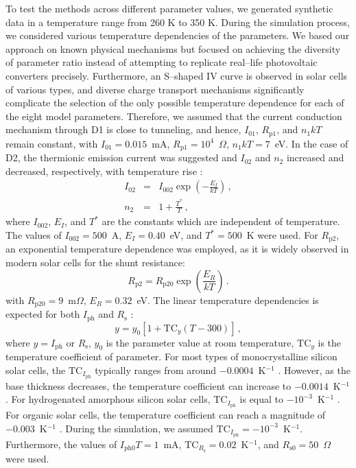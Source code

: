 \documentclass[a4paper,fleqn]{cas-dc}
\begin{document}
To test the methods across different parameter values, we generated synthetic data in a temperature range from 260 K to 350 K.
During the simulation process, we considered various temperature dependencies of the parameters.
We based our approach on known physical mechanisms but focused on achieving the diversity of parameter ratio
instead of attempting to replicate real--life photovoltaic converters precisely.
Furthermore, an S--shaped IV curve is observed in solar cells of various types,
and diverse charge transport mechanisms significantly complicate the selection of
the only possible temperature dependence for each of the eight model parameters.
Therefore, we assumed that the current conduction mechanism through D1 is close to tunneling,
and hence, $I_{01}$, $R_\mathrm{p1}$, and $n_1kT$ remain constant,
with $I_{01}=0.015$~mA, $R_\mathrm{p1}=10^4$~$\Omega$, $n_1kT=7$~eV.
In the case of D2, the thermionic emission current was suggested
and $I_{02}$ and $n_2$ increased and decreased, respectively, with temperature rise \cite{Sze2012}:
\begin{eqnarray}
I_{02}&=& I_{002}\exp\left(-\frac{E_I}{kT}\right)\,,\\
n_2&=&1+\frac{T^*}{T}\,,
\end{eqnarray}
where $I_{002}$, $E_I$, and $T^*$ are the constants which are independent of temperature.
The values of $I_{002}=500$~A, $E_I=0.40$~eV, and $T^*=500$~K were used.
For $R_\mathrm{p2}$, an exponential temperature dependence was employed,
as it is widely observed \cite{Kondratenko2019} in modern solar cells for the shunt resistance:
\begin{equation}
R_\mathrm{p2}=R_\mathrm{p20}\exp\left(\frac{E_R}{kT}\right)\,.
\end{equation}
with
$R_\mathrm{p20}=9$~m$\Omega$,
$E_R=0.32$~eV.
The linear temperature dependencies is expected for both $I_\mathrm{ph}$ \cite{Green2003,Eberle2021} and $R_\mathrm{s}$ \cite{Ibrahim2017,Bradaschia2019}:
\begin{equation}
y=y_{0}[1+\mathrm{TC}_y(T-300)]\,,
\end{equation}
where
$y=I_\mathrm{ph}$ or $R_\mathrm{s}$,
$y_0$ is the parameter value at room temperature,
$\mathrm{TC}_y$ is the temperature coefficient of parameter.
For most types of monocrystalline silicon solar cells, the $\mathrm{TC}_{I_\mathrm{ph}}$ typically ranges from around $-0.0004$~K$^{-1}$ \cite{TuanLe2021}.
However, as the base thickness decreases, the temperature coefficient can increase to $-0.0014$~K$^{-1}$ \cite{Dupre2016}.
For hydrogenated amorphous silicon solar cells, $\mathrm{TC}_{I_\mathrm{ph}}$ is equal to $-10^{-3}$~K$^{-1}$ \cite{Riesen2016}.
For organic solar cells, the temperature coefficient can reach a magnitude of $-0.003$~K$^{-1}$ \cite{Rana2018}.
During the simulation, we assumed $\mathrm{TC}_{I_\mathrm{ph}}=-10^{-3}$~K$^{-1}$.
Furthermore, the values of $I_\mathrm{ph0}T=1$~mA,
$\mathrm{TC}_{R_\mathrm{s}}=0.02$~K$^{-1}$,
and $R_\mathrm{s0}=50$~$\Omega$ were used.
\end{document}
